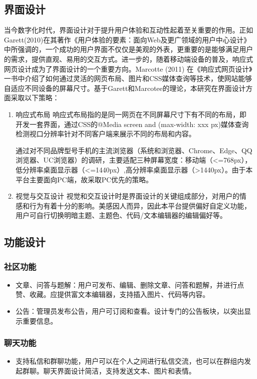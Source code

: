 \documentclass[12pt,a4paper]{article}
\begin{document}
\begin{CJK*}{UTF8}{gbsn}
\subsection{界面设计}
当今数字化时代，界面设计对于提升用户体验和互动性起着至关重要的作用。正如Garett(2010)在其著作《用户体验的要素：面向Web及更广领域的用户中心设计》中所强调的，一个成功的用户界面不仅仅是美观的外表，更重要的是能够满足用户的需求，提供直观、易用的交互方式\cite{example2}。进一步的，随着移动端设备的普及，响应式网页设计成为了界面设计的一个重要方向。Marcotte (2011) 在《响应式网页设计》一书中介绍了如何通过灵活的网页布局、图片和CSS媒体查询等技术，使网站能够自适应不同设备的屏幕尺寸。\cite{example3}基于Garett和Marcotee的理论，本研究在界面设计方面采取以下策略：
\begin{enumerate}
    \item 响应式布局
        响应式布局指的是同一网页在不同屏幕尺寸下有不同的布局，即开发一套界面，通过CSS的@Media screen and (max-width: xxx px)媒体查询检测视口分辨率针对不同客户端来展示不同的布局和内容。
        
        通过对不同品牌型号手机的主流浏览器（系统和浏览器、Chrome、Edge、QQ浏览器、UC浏览器）的调研，主要适配三种屏幕宽度：移动端（<=768px），低分辨率桌面显示器（<=1440px）,高分辨率桌面显示器（>1440px）。由于本平台主要面向PC端，故采取PC优先的策略。
    \item 视觉与交互设计
        视觉和交互设计时是界面设计的关键组成部分，对用户的情感和行为有着十分的影响。美感因人而异，因此本平台提供偏好自定义功能，用户可自行切换明暗主题、主题色、代码/文本编辑器的编辑偏好等。
        
\end{enumerate}



\subsection{功能设计}
\subsubsection{社区功能}
\begin{itemize}
  \item 文章、问答与题解：用户可发布、编辑、删除文章、问答和题解，并进行点赞、收藏。应提供富文本编辑器，支持插入图片、代码等内容。
  \item 公告：管理员发布公告，用户可订阅和查看。设计专门的公告板块，以突出显示重要信息。
\end{itemize}
\subsubsection{聊天功能}
\begin{itemize}
    \item 支持私信和群聊功能，用户可以在个人之间进行私信交流，也可以在群组内发起群聊。聊天界面设计简洁，支持发送文本、图片和表情。
\end{itemize}

\end{CJK*}
\end{document}
